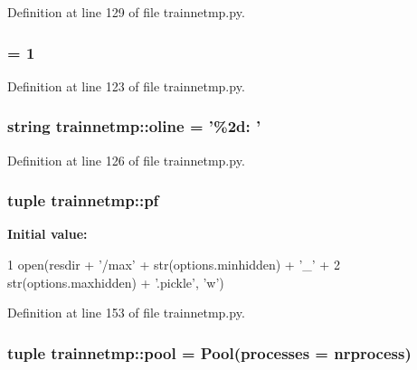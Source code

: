 Definition at line 129 of file trainnetmp.py.

\hypertarget{namespacetrainnetmp_a645db8b07923a52025222af462801dc2}{
\subsubsection[{oldj}]{ = 1}}
\label{namespacetrainnetmp_a645db8b07923a52025222af462801dc2}


Definition at line 123 of file trainnetmp.py.

\hypertarget{namespacetrainnetmp_a0fc6d0db466612f63fa6df1c682394d0}{
\subsubsection[{oline}]{\setlength{\rightskip}{0pt plus 5cm}string {\bf trainnetmp::oline} = '\%2d: '}}
\label{namespacetrainnetmp_a0fc6d0db466612f63fa6df1c682394d0}


Definition at line 126 of file trainnetmp.py.

\hypertarget{namespacetrainnetmp_a6b1fd4837c9650e7f0526c5e9b88fc05}{
\subsubsection[{pf}]{\setlength{\rightskip}{0pt plus 5cm}tuple {\bf trainnetmp::pf}}}
\label{namespacetrainnetmp_a6b1fd4837c9650e7f0526c5e9b88fc05}
{\bfseries Initial value:}
\begin{DoxyCode}
1 open(resdir + '/max' + str(options.minhidden) + '_' + 
2                       str(options.maxhidden) + '.pickle', 'w')
\end{DoxyCode}


Definition at line 153 of file trainnetmp.py.

\hypertarget{namespacetrainnetmp_a03c784c70244aab9be7a7f087f99f1e8}{
\subsubsection[{pool}]{\setlength{\rightskip}{0pt plus 5cm}tuple {\bf trainnetmp::pool} = Pool(processes = {\bf nrprocess})}}
\label{namespacetrainnetmp_a03c784c70244aab9be7a7f087f99f1e8}


